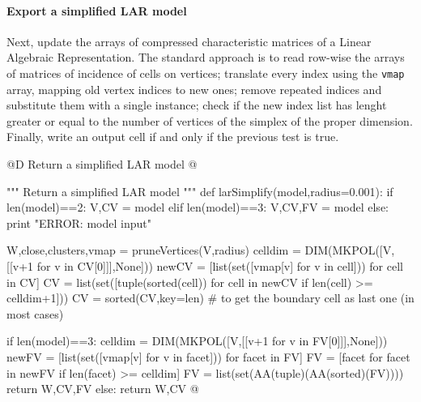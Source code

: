 \documentclass[11pt,oneside]{article}    %
\begin{document}
\paragraph{Export a simplified LAR model}
Next, update the arrays of compressed characteristic matrices of a Linear Algebraic Representation. The standard approach is to read row-wise the arrays of matrices of incidence of cells on vertices; translate every index using the \texttt{vmap} array, mapping old vertex indices to new ones; remove repeated indices and substitute them with a single instance; check if the new index list has lenght greater or equal to the number of vertices of the simplex of the proper dimension. Finally, write an output cell if and only if the previous test is true.

@D Return a simplified LAR model
@{""" Return a simplified LAR model """
def larSimplify(model,radius=0.001):
    if len(model)==2: V,CV = model 
    elif len(model)==3: V,CV,FV = model 
    else: print "ERROR: model input"
    
    W,close,clusters,vmap = pruneVertices(V,radius)
    celldim = DIM(MKPOL([V,[[v+1 for v in CV[0]]],None]))
    newCV = [list(set([vmap[v] for v in cell])) for cell in CV]
    CV = list(set([tuple(sorted(cell)) for cell in newCV if len(cell) >= celldim+1]))
    CV = sorted(CV,key=len) # to get the boundary cell as last one (in most cases)

    if len(model)==3:
        celldim = DIM(MKPOL([V,[[v+1 for v in FV[0]]],None]))
        newFV = [list(set([vmap[v] for v in facet])) for facet in FV]
        FV = [facet for facet in newFV if len(facet) >= celldim]
        FV = list(set(AA(tuple)(AA(sorted)(FV))))
        return W,CV,FV
    else: return W,CV
@}
\end{document}
